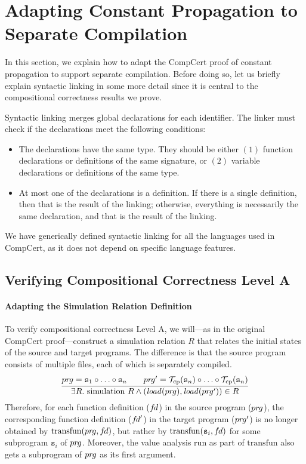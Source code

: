 \section{Adapting Constant Propagation to Separate Compilation}
\label{sec:sepcomp:constprop}

In this section, we explain how to adapt the CompCert proof of
constant propagation to support separate compilation.  Before doing
so, let us briefly explain syntactic linking in some more detail since
it is central to the compositional correctness results we prove.

Syntactic linking merges global declarations for each identifier.
The linker must check if the declarations meet the following conditions:
\begin{itemize}
\item The declarations have the same type.  They should be either
  $(1)$ function declarations or definitions of the same signature, or
  $(2)$ variable declarations or definitions of the same type.
\item At most one of the declarations is a definition.  If there is a
  single definition, then that is the result of the linking;
  otherwise, everything is necessarily the same declaration, and that
  is the result of the linking.
\end{itemize}
\noindent We have generically defined syntactic linking for all the
languages used in CompCert, as it does not depend on specific language
features.


\subsection{Verifying Compositional Correctness Level A}

\paragraph{Adapting the Simulation Relation Definition}

To verify compositional correctness Level A, we will---as in the
original CompCert proof---construct a simulation relation $R$ that
relates the initial states of the source and target programs.  The
difference is that the source program consists of multiple files, each
of which is separately compiled.
\[
\frac{
\begin{array}{@{}c@{}}
\vprg = \mathtt{s}_1\circ \ldots \circ \mathtt{s}_n \qquad
\vprg' = \mathcal{T}_\mathrm{cp}(\mathtt{s}_n)\circ \ldots \circ \mathcal{T}_\mathrm{cp}(\mathtt{s}_n)
\end{array}
}
{\exists R.~ \mathrm{simulation}~R \land (\rtlload(\vprg),\rtlload(\vprg'))\in R
}
\]
Therefore, for each function definition (${f\hspace*{-1pt}d}$) in the source program
(${pr\hspace*{-1pt}g}$), the corresponding function definition (${f\hspace*{-1pt}d}'$) in the
target program (${pr\hspace*{-1pt}g}'$) is no longer obtained by
$\mathrm{transfun}({pr\hspace*{-1pt}g},{f\hspace*{-1pt}d})$, but rather by
$\mathrm{transfun}(\mathtt{s}_i,{f\hspace*{-1pt}d})$ for some subprogram
$\mathtt{s}_i$ of ${pr\hspace*{-1pt}g}$.  Moreover, the value analysis run as part
of $\mathrm{transfun}$ also gets a subprogram of ${pr\hspace*{-1pt}g}$ as its first
argument.

